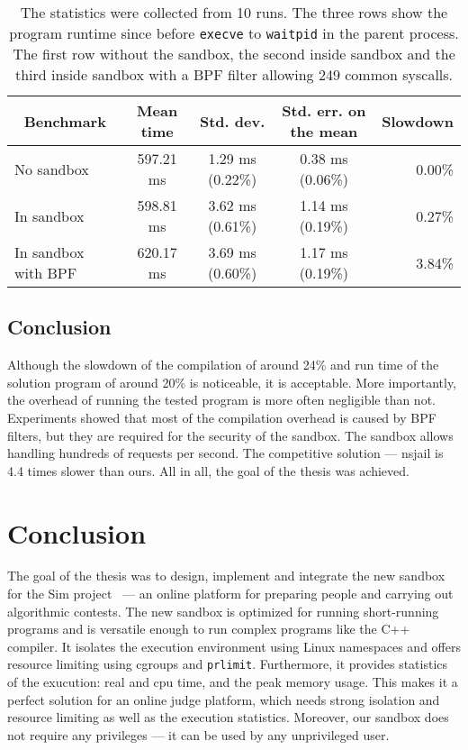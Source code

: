\documentclass[en]{pracamgr}
\begin{document}
\begin{table}[h]
\centering
\begin{tabular}{|l|c|c|c|r|}
\hline
\multicolumn{1}{|c|}{Benchmark} & Mean time & Std. dev. & Std. err. on the mean & \multicolumn{1}{c|}{Slowdown} \\
\hline
No sandbox          & 597.21 ms & 1.29 ms (0.22\%) & 0.38 ms (0.06\%) & 0.00\% \\
In sandbox          & 598.81 ms & 3.62 ms (0.61\%) & 1.14 ms (0.19\%) & 0.27\% \\
In sandbox with BPF & 620.17 ms & 3.69 ms (0.60\%) & 1.17 ms (0.19\%) & 3.84\% \\
\hline
\end{tabular}
\caption{The statistics were collected from 10 runs. The three rows show the program runtime since before \texttt{execve} to \texttt{waitpid} in the parent process. The first row without the sandbox, the second inside sandbox and the third inside sandbox with a BPF filter allowing 249 common syscalls.}
\label{table:million_lseek}
\end{table}

\fi

\section{Conclusion}

Although the slowdown of the compilation of around 24\% and run time of the solution program of around 20\% is noticeable, it is acceptable. More importantly, the overhead of running the tested program is more often negligible than not. Experiments showed that most of the compilation overhead is caused by BPF filters, but they are required for the security of the sandbox. The sandbox allows handling hundreds of requests per second. The competitive solution --- nsjail is 4.4 times slower than ours. All in all, the goal of the thesis was achieved.

\chapter{Conclusion}\label{chapter:conclusion}

The goal of the thesis was to design, implement and integrate the new sandbox for the Sim project~\cite{sim_project} --- an online platform for preparing people and carrying out algorithmic contests. The new sandbox is optimized for running short-running programs and is versatile enough to run complex programs like the C++ compiler. It isolates the execution environment using Linux namespaces and offers resource limiting using cgroups and \texttt{prlimit}. Furthermore, it provides statistics of the exucution: real and cpu time, and the peak memory usage. This makes it a perfect solution for an online judge platform, which needs strong isolation and resource limiting as well as the execution statistics. Moreover, our sandbox does not require any privileges --- it can be used by any unprivileged user.
\end{document}
